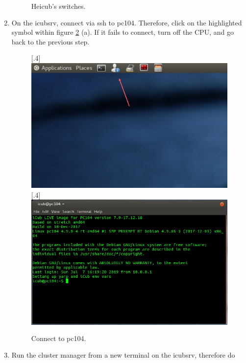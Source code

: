 \begin{enumerate}
\begin{figure}[h!]
		\caption{Heicub's switches.}
		\label{fig::B1_cpu_motor}
	\end{figure}
	\item On the icubsrv, connect via ssh to pc104. Therefore, click on the highlighted symbol within figure \ref{fig::B1_pc104} (a). If it fails to connect, turn off the CPU, and go back to the previous step.
	\begin{figure}[h!]
		\centering
		[.4\linewidth]{\includegraphics[scale=.326]{chapters/13_appendix/img/task_bar.png}}
		[.4\linewidth]{\includegraphics[scale=.22]{chapters/13_appendix/img/terminal_pc104.png}}
		\caption{Connect to pc104.}
		\label{fig::B1_pc104}
	\end{figure}
	\item Run the cluster manager from a new terminal on the icubsrv, therefore do \newline {}

\end{enumerate}
